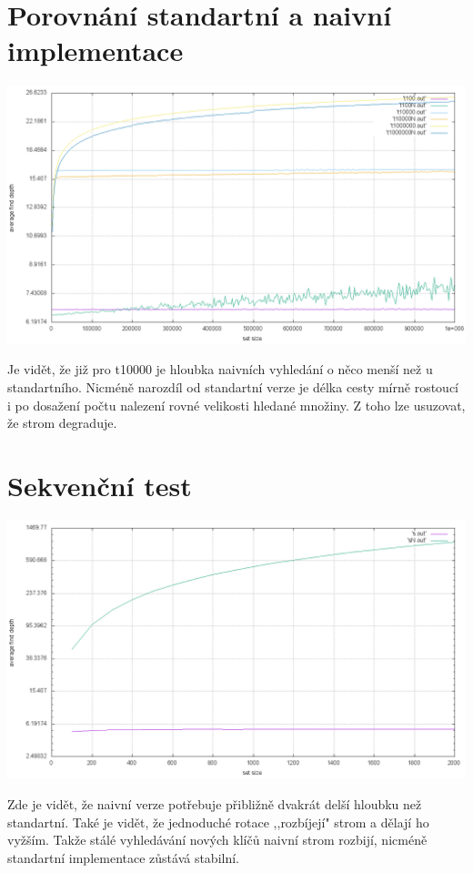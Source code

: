 \documentclass[12pt,a4paper]{report}
\begin{document}
  
\section{Porovnání standartní a naivní implementace}
\includegraphics[width=\textwidth]{./graphs/3.png}

Je vidět, že již pro t10000 je hloubka naivních vyhledání 
o něco menší než u standartního. Nicméně narozdíl od standartní verze je
délka cesty mírně rostoucí i po dosažení počtu nalezení rovné velikosti hledané
množiny. Z toho lze usuzovat, že strom degraduje. 
  
\section{Sekvenční test}
\includegraphics[width=\textwidth]{./graphs/4.png}

Zde je vidět, že naivní verze potřebuje přibližně dvakrát delší hloubku
než standartní. Také je vidět, že jednoduché rotace ,,rozbíjejí"  strom a dělají
ho vyžším. Takže stálé vyhledávání nových klíčů naivní strom rozbijí, nicméně
standartní implementace zůstává stabilní.
  
\end{document}
